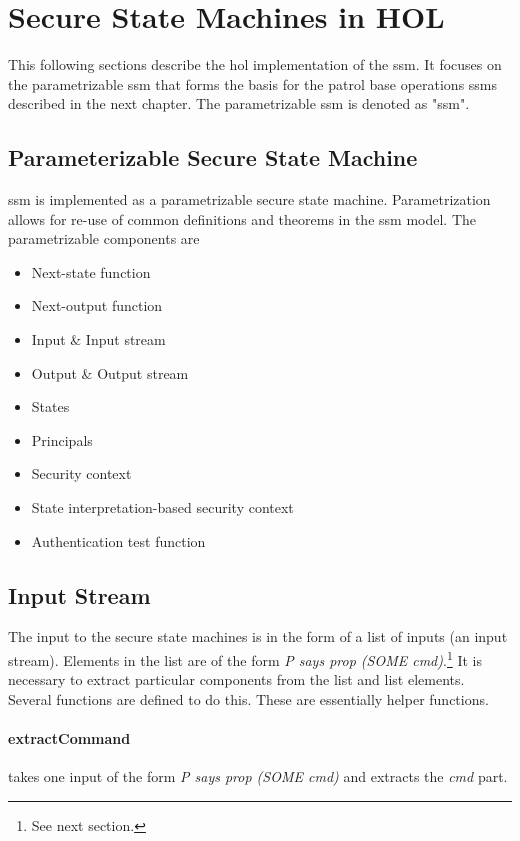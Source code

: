 \documentclass[../../main/main.tex]{subfiles}
\begin{document}
\section{Secure State Machines in HOL}\label{sec:sminHOL}
This following sections describe the \gls{hol} implementation of the \gls{ssm}.  It focuses on the parametrizable \gls{ssm} that forms the basis for the patrol base operations \glspl{ssm} described in the next chapter.  The parametrizable \gls{ssm} is denoted as "ssm".

\subsection{Parameterizable Secure State Machine}
ssm is implemented as a parametrizable secure state machine. Parametrization allows for re-use of common definitions and theorems in the \gls{ssm} model.  The parametrizable components are
\begin{itemize}
\item Next-state function
\item Next-output function
\item Input \& Input stream
\item Output \& Output stream
\item States
\item Principals
\item Security context
\item State interpretation-based security context
\item Authentication test function
\end{itemize}


\subsection{Input Stream}
The input to the secure state machines is in the form of a list of inputs (an input stream).  Elements in the list are of the form \textit{P says prop (SOME cmd)}.\footnote{See next section.}  It is necessary to extract particular components from the list and list elements.  Several functions are defined to do this.  These are essentially helper functions.

\paragraph*{extractCommand}
 takes one input of the form \textit{P says prop (SOME cmd)} and extracts the \textit{cmd} part.
\end{document}
